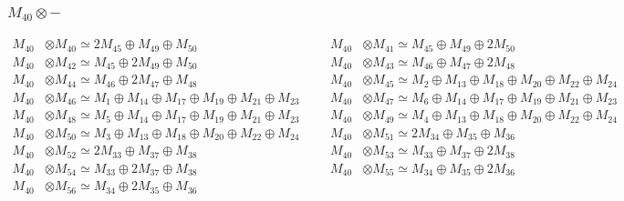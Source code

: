 \subsubsection{$ M_{40}\otimes -$}
\begin{align*}
M_{40} &\otimes M_{40} \simeq 2M_{45} \oplus M_{49} \oplus M_{50} &&& M_{40} &\otimes M_{41} \simeq M_{45} \oplus M_{49} \oplus 2M_{50}\\
M_{40} &\otimes M_{42} \simeq M_{45} \oplus 2M_{49} \oplus M_{50} &&& M_{40} &\otimes M_{43} \simeq M_{46} \oplus M_{47} \oplus 2M_{48}\\
M_{40} &\otimes M_{44} \simeq M_{46} \oplus 2M_{47} \oplus M_{48} &&& M_{40} &\otimes M_{45} \simeq M_{2} \oplus M_{13} \oplus M_{18} \oplus M_{20} \oplus M_{22} \oplus M_{24}\\
M_{40} &\otimes M_{46} \simeq M_{1} \oplus M_{14} \oplus M_{17} \oplus M_{19} \oplus M_{21} \oplus M_{23} &&& M_{40} &\otimes M_{47} \simeq M_{6} \oplus M_{14} \oplus M_{17} \oplus M_{19} \oplus M_{21} \oplus M_{23}\\
M_{40} &\otimes M_{48} \simeq M_{5} \oplus M_{14} \oplus M_{17} \oplus M_{19} \oplus M_{21} \oplus M_{23} &&& M_{40} &\otimes M_{49} \simeq M_{4} \oplus M_{13} \oplus M_{18} \oplus M_{20} \oplus M_{22} \oplus M_{24}\\
M_{40} &\otimes M_{50} \simeq M_{3} \oplus M_{13} \oplus M_{18} \oplus M_{20} \oplus M_{22} \oplus M_{24} &&& M_{40} &\otimes M_{51} \simeq 2M_{34} \oplus M_{35} \oplus M_{36}\\
M_{40} &\otimes M_{52} \simeq 2M_{33} \oplus M_{37} \oplus M_{38} &&& M_{40} &\otimes M_{53} \simeq M_{33} \oplus M_{37} \oplus 2M_{38}\\
M_{40} &\otimes M_{54} \simeq M_{33} \oplus 2M_{37} \oplus M_{38} &&& M_{40} &\otimes M_{55} \simeq M_{34} \oplus M_{35} \oplus 2M_{36}\\
M_{40} &\otimes M_{56} \simeq M_{34} \oplus 2M_{35} \oplus M_{36}
\end{align*}

